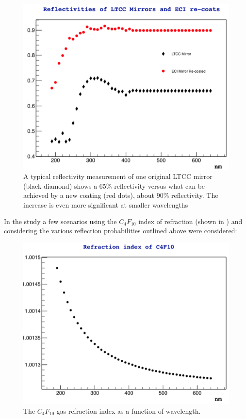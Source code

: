\begin{figure}
	\centering
	\includegraphics[width=0.98\columnwidth, height=0.7\columnwidth]{img/reflectivityGain.png}
	\caption{A typical reflectivity measurement of one original LTCC mirror (black diamond) shows a 65\% reflectivity versus what can be achieved
		      by a new coating (red dots), about 90\% reflectivity. The increase is even more significant at smaller wavelengths }
	\label{fig:reflectivityGain}
\end{figure}

In the study a few scenarios using the $C_4F_{10}$ index of refraction (shown in )
and considering the various reflection probabilities outlined above  were considered:

\begin{figure}
	\centering
	\includegraphics[width=0.98\columnwidth, height=0.65\columnwidth]{img/c4f10RefrIndex.png}
	\caption{The $C_4F_{10}$ gas refraction index as a function of wavelength.}
	\label{fig:c4f10RefrIndex}
\end{figure}


